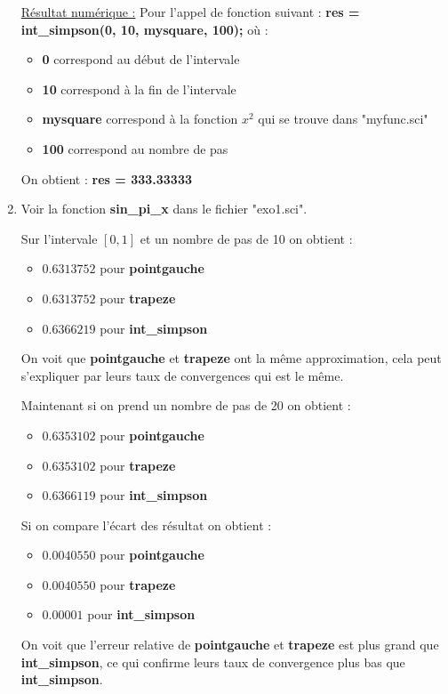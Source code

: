 \documentclass[12pt, letterpaper]{article}
\begin{document}
\begin{enumerate}
  \underline{Résultat numérique :} \newline
  Pour l'appel de fonction suivant : \newline
  \textbf{res = int\_simpson(0, 10, mysquare, 100);} \newline
  où :
  \begin{itemize}
  \item \textbf{0} correspond au début de l'intervale
  \item \textbf{10} correspond à la fin de l'intervale
  \item \textbf{mysquare} correspond à la fonction $x^2$ qui se trouve
    dans \newline "myfunc.sci"
  \item \textbf{100} correspond au nombre de pas
  \end{itemize}

  On obtient : \textbf{res = 333.33333}


\item Voir la fonction \textbf{sin\_pi\_x} dans le fichier
  "exo1.sci".\newline 

  Sur l'intervale $[0, 1]$ et un nombre de pas de 10  on obtient :
  \begin{itemize}
  \item $ 0.6313752 $ pour \textbf{pointgauche}
  \item $ 0.6313752 $ pour \textbf{trapeze}
  \item $ 0.6366219 $ pour \textbf{int\_simpson}
  \end{itemize}

  On voit que \textbf{pointgauche} et \textbf{trapeze} ont la même
  approximation, cela peut s'expliquer par leurs taux de convergences
  qui est le même.\newline

  Maintenant si on prend un nombre de pas de 20 on obtient :
    \begin{itemize}
    \item $ 0.6353102 $ pour \textbf{pointgauche}
    \item $ 0.6353102 $ pour \textbf{trapeze}
    \item $ 0.6366119 $ pour \textbf{int\_simpson}
    \end{itemize}

    Si on compare l'écart des résultat on obtient :
    \begin{itemize}
    \item $ 0.0040550 $ pour \textbf{pointgauche}
    \item $ 0.0040550 $ pour \textbf{trapeze}
    \item $ 0.00001 $ pour \textbf{int\_simpson}
    \end{itemize}

    On voit que l'erreur relative de \textbf{pointgauche} et \textbf{trapeze}
    est plus grand que \textbf{int\_simpson}, ce qui confirme leurs
    taux de convergence plus bas que \textbf{int\_simpson}.
        
\end{enumerate}
\end{document}
